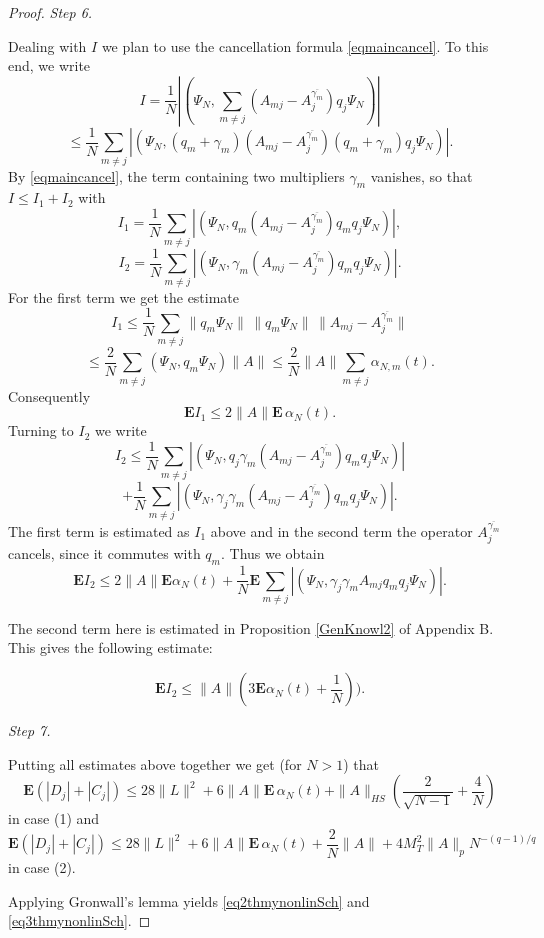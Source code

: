 \documentclass[12pt]{article}
\def\E{\mathbf{E}}
\def\al{\alpha}
\def\ga{\gamma}
\begin{document}
\begin{proof}
{\it Step 6.}

Dealing with $I$ we plan to use the cancellation formula  \eqref{eqmaincancel}.
To this end, we write
\[
I=\frac{1}{N}  |(\Psi_N, \sum_{m\neq j} (A_{mj}-A_j^{\overline{\ga_m}}) q_j \Psi_N)|
\]
\[
\le \frac{1}{N}  \sum_{m\neq j}  |(\Psi_N, (q_m+\ga_m)(A_{mj}-A_j^{\overline{\ga_m}}) (q_m+\ga_m)q_j \Psi_N)|.
\]
By \eqref{eqmaincancel}, the term containing two multipliers $\ga_m$ vanishes, so that
$I\le I_1+I_2$ with
 \[
I_1= \frac{1}{N}  \sum_{m\neq j}  |(\Psi_N, q_m (A_{mj}-A_j^{\overline{\ga_m}}) q_m q_j \Psi_N)|,
 \]
 \[
I_2 =\frac{1}{N}  \sum_{m\neq j}  |(\Psi_N, \ga_m(A_{mj}-A_j^{\overline{\ga_m}}) q_m q_j \Psi_N)|.
 \]
 For the first term we get the estimate
 \[
I_1 \le \frac{1}{N} \sum_{m\neq j}
\| q_m \Psi_N\| \, \| q_m \Psi_N\| \, \|A_{mj}-A_j^{\overline{\ga_m}}\|
\]
\[
\le \frac{2}{N} \sum_{m\neq j}  (\Psi_N, q_m \Psi_N) \|A\|
\le \frac{2}{N}  \|A\| \sum_{m\neq j}  \al_{N,m}(t).
 \]
 Consequently
 \[
  \E I_1 \le 2 \|A\| \E \, \al_N(t).
  \]
Turning to $I_2$ we write
\[
I_2\le\frac{1}{N}  \sum_{m\neq j}
|(\Psi_N, q_j\ga_m(A_{mj}-A_j^{\overline{\ga_m}}) q_m q_j \Psi_N)|
\]
\[
+\frac{1}{N}  \sum_{m\neq j}
|(\Psi_N, \ga_j\ga_m(A_{mj}-A_j^{\overline{\ga_m}}) q_m q_j \Psi_N)|.
\]
The first term is estimated as $I_1$ above and in the second term the operator $A_j^{\overline{\ga_m}}$ cancels,
since it commutes with $q_m$. Thus we obtain
 \begin{equation}
\label{eqforalphaconder49}
\E I_2 \le  2 \|A\| \E \al_N(t)
+\frac{1}{N}  \E \sum_{m\neq j}  |(\Psi_N, \ga_j\ga_m A_{mj} q_m q_j\Psi_N)|.
\end{equation}

The second term here is estimated in Proposition \ref{GenKnowl2} of Appendix B.
 This gives the following estimate:

\[
\E I_2 \le \|A\| (3\E \al_N(t)+\frac{1}{N})).
\]

{\it Step 7.}

Putting all estimates above together we get (for $N>1$) that
 \begin{equation}
\label{eqforalphaconder5}
\E (|D_j|+|C_j|) \le 28 \|L\|^2+6 \|A\| \E \, \al_N(t)
+\|A\|_{HS} \left(\frac{2}{\sqrt{N-1}}+\frac{4}{N}\right)
\end{equation}
in case (1) and
\[
\E (|D_j|+|C_j|) \le 28 \|L\|^2+6 \|A\| \E \, \al_N(t)
+\frac{2}{N}\|A\|+ 4 M_T^2 \|A\|_p N^{-(q-1)/q}
\]
in case (2).

Applying Gronwall's lemma yields \eqref{eq2thmynonlinSch} and \eqref{eq3thmynonlinSch}.

\end{proof}
\end{document}
